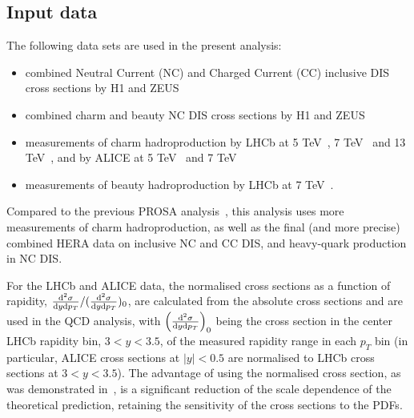 \documentclass[12pt]{article}
\begin{document}
\subsection{Input data}
\label{sec:data}

The following data sets are used in the present analysis:
\begin{itemize}
    \item combined Neutral Current (NC) and Charged Current (CC) inclusive DIS cross sections by H1 and ZEUS~\cite{Abramowicz:2015mha}
    \item combined charm and beauty NC DIS cross sections by H1 and ZEUS~\cite{H1:2018flt}
    \item measurements of charm hadroproduction by LHCb at 5 TeV~\cite{Aaij:2016jht}, 7 TeV~\cite{Aaij:2013mga} and 13 TeV~\cite{Aaij:2015bpa}, and by ALICE at 5 TeV~\cite{Acharya:2019mgn} and 7 TeV~\cite{Acharya:2017jgo}
    \item measurements of beauty hadroproduction by LHCb at 7 TeV~\cite{Aaij:2013noa}.
\end{itemize}
Compared to the previous PROSA analysis~\cite{Zenaiev:2015rfa}, this analysis uses more measurements of charm hadroproduction,
as well as the final (and more precise) combined HERA data on inclusive NC and CC DIS, and heavy-quark production in NC DIS.

For the LHCb and ALICE data, the normalised cross sections as a function of rapidity, $\frac{{\rm d}^2\sigma}{{\rm d}y{\rm d}p_T} / (\frac{{\rm d}^2\sigma}{{\rm d}y{\rm d}p_T})_{0}$, are calculated from the absolute cross sections and are used in the 
QCD analysis, with $\left(\frac{{\rm d}^2\sigma}{{\rm d}y{\rm d}p_T}\right)_{0}$ being the cross section in the center LHCb rapidity bin, $3 < y < 3.5$, of 
the measured rapidity range in each $p_T$ bin (in particular, ALICE cross sections at $|y| < 0.5$ are normalised to LHCb cross sections at $3 < y < 3.5$). 
The advantage of using the normalised cross section, as was demonstrated in~\cite{Zenaiev:2015rfa}, is a significant
reduction of the scale dependence of the theoretical prediction, retaining the sensitivity of the cross sections to 
the PDFs. 
\end{document}

